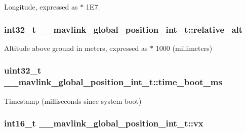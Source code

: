 Longitude, expressed as $\ast$ 1\+E7. 

\hypertarget{struct____mavlink__global__position__int__t_a1b3d36234adcacbedc88c37c1712f4b1}{
\subsubsection[{relative\+\_\+alt}]{\setlength{\rightskip}{0pt plus 5cm}int32\+\_\+t \+\_\+\+\_\+mavlink\+\_\+global\+\_\+position\+\_\+int\+\_\+t\+::relative\+\_\+alt}}\label{struct____mavlink__global__position__int__t_a1b3d36234adcacbedc88c37c1712f4b1}


Altitude above ground in meters, expressed as $\ast$ 1000 (millimeters) 

\hypertarget{struct____mavlink__global__position__int__t_a1b56c431f19cff6fadc2b0ac3b5959b6}{
\subsubsection[{time\+\_\+boot\+\_\+ms}]{\setlength{\rightskip}{0pt plus 5cm}uint32\+\_\+t \+\_\+\+\_\+mavlink\+\_\+global\+\_\+position\+\_\+int\+\_\+t\+::time\+\_\+boot\+\_\+ms}}\label{struct____mavlink__global__position__int__t_a1b56c431f19cff6fadc2b0ac3b5959b6}


Timestamp (milliseconds since system boot) 

\hypertarget{struct____mavlink__global__position__int__t_a1f2bef1206e578e3f0f85f7854621829}{
\subsubsection[{vx}]{\setlength{\rightskip}{0pt plus 5cm}int16\+\_\+t \+\_\+\+\_\+mavlink\+\_\+global\+\_\+position\+\_\+int\+\_\+t\+::vx}}\label{struct____mavlink__global__position__int__t_a1f2bef1206e578e3f0f85f7854621829}


